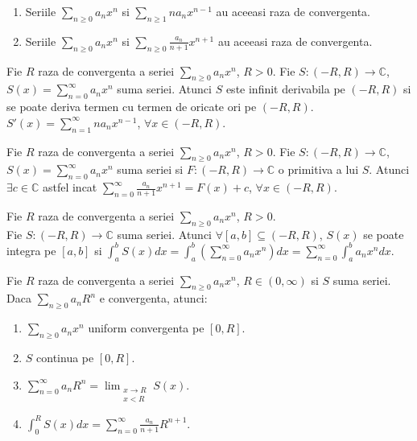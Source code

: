 \documentclass{article}
\begin{document}
\begin{enumerate}
\propozitie 
  \begin{enumerate}
    \item Seriile $\sum_{n \geq 0} a_n x^n$ si $\sum_{n \geq 1} n a_n x^{n-1}$ au aceeasi raza de convergenta.
    \item Seriile $\sum_{n \geq 0} a_n x^n$ si $\sum_{n \geq 0} \frac{a_n}{n+1} x^{n+1}$ au aceeasi raza de convergenta. 
  \end{enumerate}

\begin{tcolorbox}
  \propozitie Fie $R$ raza de convergenta a seriei $\sum_{n \geq 0} a_n x^n$, $R > 0$. Fie $S : (-R, R) \to \mathbb{C}$, $S(x) = \sum_{n = 0}^{\infty} a_n x^n$ suma seriei. Atunci $S$ este infinit derivabila pe $(-R, R)$ si se poate deriva termen cu termen de oricate ori pe $(-R, R)$.
  \observatie $S'(x) = \sum_{n = 1}^{\infty} n a_n x^{n-1}$, $\forall x \in (-R, R)$.
\end{tcolorbox}

  \propozitie Fie $R$ raza de convergenta a seriei $\sum_{n \geq 0} a_n x^n$, $R > 0$. Fie $S : (-R, R) \to \mathbb{C}$, $S(x) = \sum_{n = 0}^{\infty} a_n x^n$ suma seriei si $F : (-R, R) \to \mathbb{C}$ o primitiva a lui $S$. Atunci $\exists c \in \mathbb{C}$ astfel incat $\sum_{n = 0}^{\infty} \frac{a_n}{n + 1} x^{n+1} = F(x) + c$, $\forall x \in (-R, R)$. 

\begin{tcolorbox}
  \propozitie Fie $R$ raza de convergenta a seriei $\sum_{n \geq 0} a_n x^n$, $R > 0$. \\ Fie $S : (-R, R) \to \mathbb{C}$ suma seriei. Atunci $\forall [a, b] \subseteq (-R, R)$, $S(x)$ se poate integra pe $[a, b]$ si $\int_a^b S(x) dx = \int_a^b \left(\sum_{n = 0}^{\infty} a_n x^n \right)dx = \sum_{n=0}^{\infty}\int_a^b a_n x^n dx$.
\end{tcolorbox}

\newpage
  \propozitie Fie $R$ raza de convergenta a seriei $\sum_{n \geq 0} a_n x^n$, $R \in (0, \infty)$ si $S$ suma seriei. Daca $\sum_{n \geq 0} a_n R^n$ e convergenta, atunci:
  \begin{enumerate}[nosep]
    \item $\sum_{n \geq 0} a_n x^n$ uniform convergenta pe $[0, R]$.
    \item $S$ continua pe $[0, R]$.
    \item $\sum_{n = 0}^{\infty} a_n R^n = \lim_{\substack{x \to R \\ x < R}} S(x)$.
    \item $\int_0^R S(x) dx = \sum_{n = 0}^{\infty} \frac{a_n}{n+1} R^{n+1}$.
  \end{enumerate}


\end{enumerate}
\end{document}
